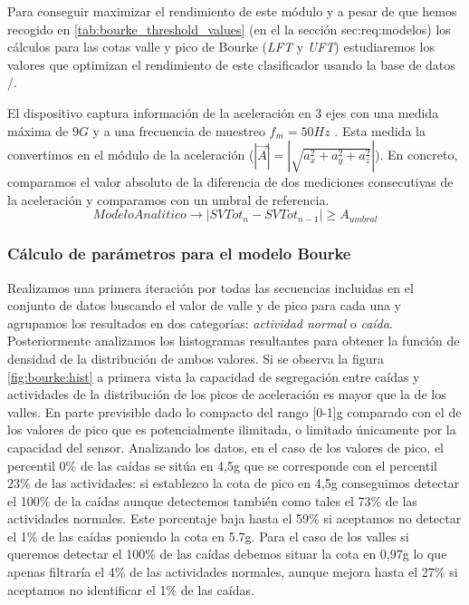 Para conseguir maximizar el rendimiento de este módulo y a pesar de que hemos recogido en \autoref{tab:bourke_threshold_values} (en el la sección \refname{sec:req:modelos}) los cálculos para las cotas valle y pico de Bourke (\textit{LFT} y \textit{UFT}) estudiaremos los valores que optimizan el rendimiento de este clasificador usando la base de datos \sisfall/. 





El dispositivo captura información de la aceleración en 3 ejes con una medida máxima de $9G$ y a una frecuencia de muestreo $f_m=50Hz$ . Esta medida la convertimos en el módulo de la aceleración ($|\vec{A}| = |\sqrt{a_{x}^2+a_{y}^2+a_{z}^2}|$). En concreto, comparamos el valor absoluto de la diferencia de dos mediciones consecutivas de la aceleración y comparamos con un umbral de referencia.
\[
ModeloAnalitico\rightarrow |SVTot_n - SVTot_{n-1}|\geq A_{umbral}
\]

\subsubsection{Cálculo de parámetros para el modelo Bourke}

Realizamos una primera iteración por todas las secuencias incluidas en el conjunto de datos buscando el valor de valle y de pico para cada una y agrupamos los resultados en dos categorías: \textit{actividad normal} o \textit{caída}. Posteriormente analizamos los histogramas resultantes para obtener la función de densidad de la distribución de ambos valores. Si se observa la figura \ref{fig:bourke:hist} a primera vista la capacidad de segregación entre caídas y actividades de la distribución de los picos de aceleración es mayor que la de los valles. En parte previsible dado lo compacto del rango [0-1]g comparado con el de los valores de pico que es potencialmente ilimitada, o limitado únicamente por la capacidad del sensor. Analizando los datos, en el caso de los valores de pico, el percentil 0\% de las caídas se sitúa en 4,5g que se corresponde con el percentil 23\% de las actividades: si establezco la cota de pico en 4,5g conseguimos detectar el 100\% de la caídas aunque detectemos también como tales el 73\% de las actividades normales. Este porcentaje baja hasta el 59\% si aceptamos no detectar el 1\% de las caídas poniendo la cota en 5.7g. Para el caso de los valles si queremos detectar el 100\% de las caídas debemos situar la cota en 0,97g lo que apenas filtraría el 4\% de las actividades normales, aunque mejora hasta el 27\% si aceptamos no identificar el 1\% de las caídas.

